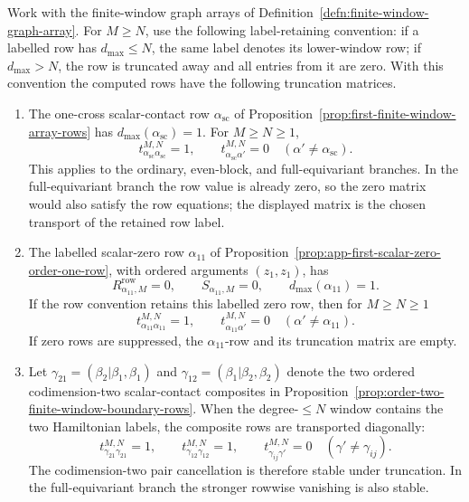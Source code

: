 \begin{prop}\label{prop:computed-finite-window-truncation-matrices}
  Work with the finite-window graph arrays of
  Definition~\ref{defn:finite-window-graph-array}.  For \(M\geq N\), use the
	  following label-retaining convention: if a labelled row has
	  \(d_{\max}\leq N\), the same label denotes its lower-window row; if
	  \(d_{\max}>N\), the row is truncated away and all entries
	  from it are zero.  With this convention the computed rows have the
  following truncation matrices.

  \begin{enumerate}[label=(T\arabic*)]
    \item The one-cross scalar-contact row
    \(\alpha_{\mathrm{sc}}\) of
    Proposition~\ref{prop:first-finite-window-array-rows} has
    \(d_{\max}(\alpha_{\mathrm{sc}})=1\).  For \(M\geq N\geq1\),
    \[
      t^{M,N}_{\alpha_{\mathrm{sc}}\alpha_{\mathrm{sc}}}=1,
      \qquad
      t^{M,N}_{\alpha_{\mathrm{sc}}\alpha'}=0
      \quad(\alpha'\neq\alpha_{\mathrm{sc}}).
    \]
    This applies to the ordinary, even-block, and full-equivariant branches.
    In the full-equivariant branch the row value is already zero, so the
    zero matrix would also satisfy the row equations; the displayed matrix is
    the chosen transport of the retained row label.

    \item The labelled scalar-zero row \(\alpha_{11}\) of
    Proposition~\ref{prop:app-first-scalar-zero-order-one-row}, with ordered
    arguments \((z_1,z_1)\), has
    \[
      R^{\mathrm{row}}_{\alpha_{11},M}=0,\qquad
      S_{\alpha_{11},M}=0,
      \qquad d_{\max}(\alpha_{11})=1.
    \]
    If the row convention retains this labelled zero row, then for
    \(M\geq N\geq1\)
    \[
      t^{M,N}_{\alpha_{11}\alpha_{11}}=1,
      \qquad
      t^{M,N}_{\alpha_{11}\alpha'}=0
      \quad(\alpha'\neq\alpha_{11}).
    \]
    If zero rows are suppressed, the \(\alpha_{11}\)-row and its truncation
    matrix are empty.

    \item Let
    \(\gamma_{21}=(\beta_2|\beta_1,\beta_1)\) and
    \(\gamma_{12}=(\beta_1|\beta_2,\beta_2)\) denote the two ordered
    codimension-two scalar-contact composites in
    Proposition~\ref{prop:order-two-finite-window-boundary-rows}.  When the
    degree-\(\leq N\) window contains the two Hamiltonian labels, the
    composite rows are transported diagonally:
    \[
      t^{M,N}_{\gamma_{21}\gamma_{21}}=1,\qquad
      t^{M,N}_{\gamma_{12}\gamma_{12}}=1,\qquad
      t^{M,N}_{\gamma_{ij}\gamma'}=0
      \quad(\gamma'\neq\gamma_{ij}).
    \]
    The codimension-two pair cancellation is therefore stable under
    truncation.  In the full-equivariant branch the stronger rowwise
    vanishing is also stable.


\end{enumerate}
\end{prop}
